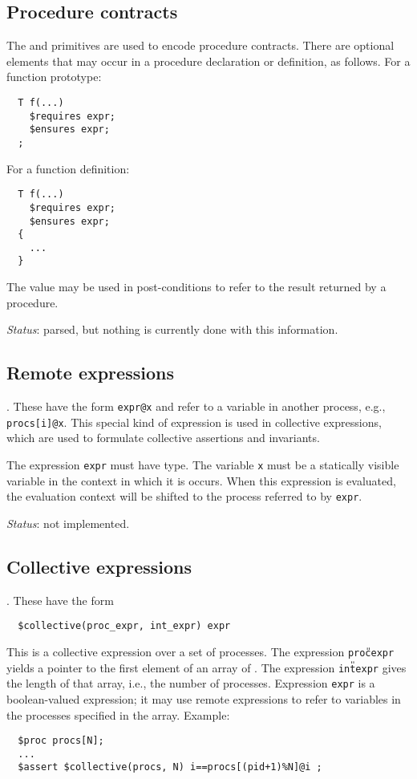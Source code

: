 \documentclass[11pt, oneside, letterpaper]{book}
\begin{document}
\subsection{Procedure contracts}
The \crequires{} and \censures{} primitives are used to encode
procedure contracts.  There are optional
elements that may occur in a procedure declaration or definition,
as follows.  For a function prototype:
\begin{verbatim}
  T f(...)
    $requires expr;
    $ensures expr;
  ;
\end{verbatim}
For a function definition:
\begin{verbatim}
  T f(...)
    $requires expr;
    $ensures expr;
  {
    ...
  }
\end{verbatim}
The value \cresult{} may be used in post-conditions to refer
to the result returned by a procedure.

\emph{Status}: parsed, but nothing is currently done with this
information.

\subsection{Remote expressions}.  These have the form \verb!expr@x!
and refer to a variable in another process, e.g., \verb!procs[i]@x!.
This special kind of expression is used in collective expressions,
which are used to formulate collective assertions and invariants.

The expression \verb!expr! must have \cproc{} type.  The variable
\texttt{x} must be a statically visible variable in the context in
which it is occurs.  When this expression is evaluated, the evaluation
context will be shifted to the process referred to by \texttt{expr}.

\emph{Status}: not implemented.

\subsection{Collective expressions}.  These have the form
\begin{verbatim}
  $collective(proc_expr, int_expr) expr 
\end{verbatim}
This is a collective expression over a set of processes.  The
expression \texttt{proc{\U}expr} yields a pointer to the first element
of an array of \cproc.  The expression \texttt{int{\U}expr} gives the
length of that array, i.e., the number of processes.  Expression
\texttt{expr} is a boolean-valued expression; it may use remote
expressions to refer to variables in the processes specified in the
array.  Example:
\begin{verbatim}
  $proc procs[N];
  ...
  $assert $collective(procs, N) i==procs[(pid+1)%N]@i ;
\end{verbatim}
\end{document}
